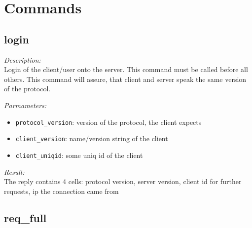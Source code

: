 \section{Commands}

\subsection{login}

\begin{description}
\item {\it Description:}\\
Login of the client/user onto the server. This command must be called before all others. This command will assure, that client and server speak the same version of the protocol.
\item {\it Parmameters:}
\begin{itemize}
\item {\tt protocol\_version}: version of the protocol, the client expects
\item {\tt client\_version}: name/version string of the client
\item {\tt client\_uniqid}: some uniq id of the client
\end{itemize}
\item {\it Result:}\\
The reply contains 4 cells: protocol version, server version, client id for further requests, ip the connection came from
\end{description}

\subsection{req\_full}

